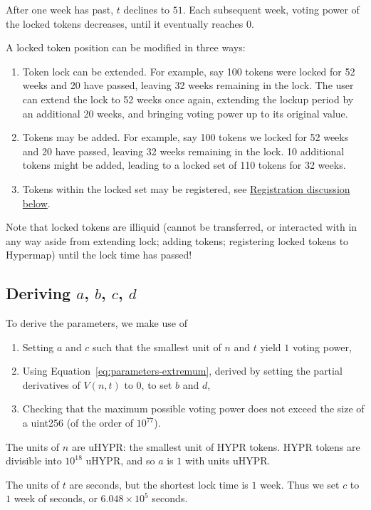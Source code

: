 \documentclass{article}
\begin{document}
After one week has past, $t$ declines to $51$.
Each subsequent week, voting power of the locked tokens decreases, until it eventually reaches $0$.

A locked token position can be modified in three ways:
\begin{enumerate}
    \item Token lock can be extended.
       For example, say 100 tokens were locked for 52 weeks and 20 have passed, leaving 32 weeks remaining in the lock.
       The user can extend the lock to 52 weeks once again, extending the lockup period by an additional 20 weeks, and bringing voting power up to its original value.
    \item Tokens may be added.
       For example, say 100 tokens we locked for 52 weeks and 20 have passed, leaving 32 weeks remaining in the lock.
       10 additional tokens might be added, leading to a locked set of 110 tokens for 32 weeks.
    \item Tokens within the locked set may be registered, see \hyperref[sec:registration]{Registration discussion below}.
\end{enumerate}

Note that locked tokens are illiquid (cannot be transferred, or interacted with in any way aside from extending lock; adding tokens; registering locked tokens to Hypermap) until the lock time has passed!

\subsection{Deriving $a$, $b$, $c$, $d$}\label{sec:deriving-parameters}

To derive the parameters, we make use of
\begin{enumerate}
	\item Setting $a$ and $c$ such that the smallest unit of $n$ and $t$ yield $1$ voting power,
	\item Using Equation~\ref{eq:parameters-extremum}, derived by setting the partial derivatives of $V(n,t)$ to $0$, to set $b$ and $d$,
	\item Checking that the maximum possible voting power does not exceed the size of a uint256 (of the order of $10^{77}$).
\end{enumerate}

The units of $n$ are uHYPR: the smallest unit of HYPR tokens.
HYPR tokens are divisible into $10^{18}$ uHYPR, and so $a$ is $1$ with units uHYPR.

The units of $t$ are seconds, but the shortest lock time is $1$ week.
Thus we set $c$ to $1$ week of seconds, or $6.048 \times 10^5$ seconds.
\end{document}
